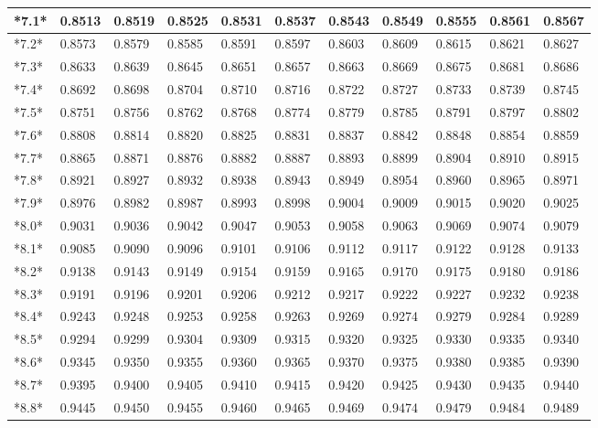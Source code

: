 \documentclass[margin=0.5in]{article}
\begin{document}
\begin{center}
\begin{tabular}{|l|l|l|l|l|l|l|l|l|l|l|}
\hline
*7.1* & 0.8513 & 0.8519 & 0.8525 & 0.8531 & 0.8537 & 0.8543 & 0.8549 & 0.8555 & 0.8561 & 0.8567 \\
\hline
*7.2* & 0.8573 & 0.8579 & 0.8585 & 0.8591 & 0.8597 & 0.8603 & 0.8609 & 0.8615 & 0.8621 & 0.8627 \\
\hline
*7.3* & 0.8633 & 0.8639 & 0.8645 & 0.8651 & 0.8657 & 0.8663 & 0.8669 & 0.8675 & 0.8681 & 0.8686 \\
\hline
*7.4* & 0.8692 & 0.8698 & 0.8704 & 0.8710 & 0.8716 & 0.8722 & 0.8727 & 0.8733 & 0.8739 & 0.8745 \\
\hline
*7.5* & 0.8751 & 0.8756 & 0.8762 & 0.8768 & 0.8774 & 0.8779 & 0.8785 & 0.8791 & 0.8797 & 0.8802 \\
\hline
*7.6* & 0.8808 & 0.8814 & 0.8820 & 0.8825 & 0.8831 & 0.8837 & 0.8842 & 0.8848 & 0.8854 & 0.8859 \\
\hline
*7.7* & 0.8865 & 0.8871 & 0.8876 & 0.8882 & 0.8887 & 0.8893 & 0.8899 & 0.8904 & 0.8910 & 0.8915 \\
\hline
*7.8* & 0.8921 & 0.8927 & 0.8932 & 0.8938 & 0.8943 & 0.8949 & 0.8954 & 0.8960 & 0.8965 & 0.8971 \\
\hline
*7.9* & 0.8976 & 0.8982 & 0.8987 & 0.8993 & 0.8998 & 0.9004 & 0.9009 & 0.9015 & 0.9020 & 0.9025 \\
\hline
*8.0* & 0.9031 & 0.9036 & 0.9042 & 0.9047 & 0.9053 & 0.9058 & 0.9063 & 0.9069 & 0.9074 & 0.9079 \\
\hline
*8.1* & 0.9085 & 0.9090 & 0.9096 & 0.9101 & 0.9106 & 0.9112 & 0.9117 & 0.9122 & 0.9128 & 0.9133 \\
\hline
*8.2* & 0.9138 & 0.9143 & 0.9149 & 0.9154 & 0.9159 & 0.9165 & 0.9170 & 0.9175 & 0.9180 & 0.9186 \\
\hline
*8.3* & 0.9191 & 0.9196 & 0.9201 & 0.9206 & 0.9212 & 0.9217 & 0.9222 & 0.9227 & 0.9232 & 0.9238 \\
\hline
*8.4* & 0.9243 & 0.9248 & 0.9253 & 0.9258 & 0.9263 & 0.9269 & 0.9274 & 0.9279 & 0.9284 & 0.9289 \\
\hline
*8.5* & 0.9294 & 0.9299 & 0.9304 & 0.9309 & 0.9315 & 0.9320 & 0.9325 & 0.9330 & 0.9335 & 0.9340 \\
\hline
*8.6* & 0.9345 & 0.9350 & 0.9355 & 0.9360 & 0.9365 & 0.9370 & 0.9375 & 0.9380 & 0.9385 & 0.9390 \\
\hline
*8.7* & 0.9395 & 0.9400 & 0.9405 & 0.9410 & 0.9415 & 0.9420 & 0.9425 & 0.9430 & 0.9435 & 0.9440 \\
\hline
*8.8* & 0.9445 & 0.9450 & 0.9455 & 0.9460 & 0.9465 & 0.9469 & 0.9474 & 0.9479 & 0.9484 & 0.9489 \\

\end{tabular}
\end{center}
\end{document}
